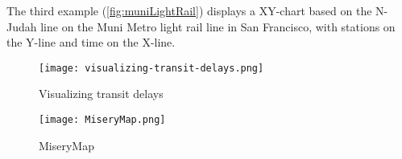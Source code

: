 The third example (\vref{fig:muniLightRail}) displays a XY-chart based on the N-Judah line on the Muni 
Metro light rail line in San Francisco, with stations on the Y-line and time on
the X-line.

\begin{figure}[!htbp]
	\texttt{[image: visualizing-transit-delays.png]}
	\caption[Visualizing transit delays]{Visualizing transit delays \cite{muniLightRail}}
	\label{fig:muniLightRail}
\end{figure}

\begin{figure}[!htbp]
	\texttt{[image: MiseryMap.png]}
	\caption[MiseryMap]{MiseryMap \cite{flightAware:MiseryMap}}
	\label{fig:miserymap}
\end{figure}
 
